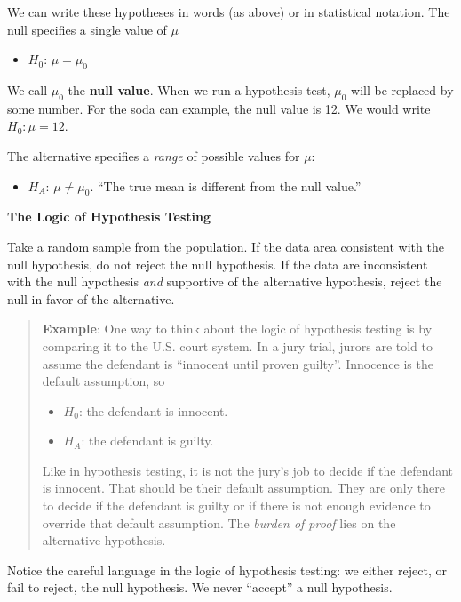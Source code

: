 \documentclass[
]{book}
\providecommand{\tightlist}{%
  \setlength{\itemsep}{0pt}\setlength{\parskip}{0pt}}
\begin{document}
We can write these hypotheses in words (as above) or in statistical notation. The null specifies a single value of \(\mu\)

\begin{itemize}
\tightlist
\item
  \(H_0\): \(\mu=\mu_0\)
\end{itemize}

We call \(\mu_0\) the \textbf{null value}. When we run a hypothesis test, \(\mu_0\) will be replaced by some number. For the soda can example, the null value is 12. We would write \(H_0: \mu = 12\).

The alternative specifies a \emph{range} of possible values for \(\mu\):

\begin{itemize}
\tightlist
\item
  \(H_A\): \(\mu\ne\mu_0\). ``The true mean is different from the null value.''
\end{itemize}

\textbf{The Logic of Hypothesis Testing}

Take a random sample from the population. If the data area consistent with the null hypothesis, do not reject the null hypothesis. If the data are inconsistent with the null hypothesis \emph{and} supportive of the alternative hypothesis, reject the null in favor of the alternative.

\begin{quote}
\textbf{Example}: One way to think about the logic of hypothesis testing is by comparing it to the U.S. court system. In a jury trial, jurors are told to assume the defendant is ``innocent until proven guilty''. Innocence is the default assumption, so

\begin{itemize}
\tightlist
\item
  \(H_0\): the defendant is innocent.
\item
  \(H_A\): the defendant is guilty.
\end{itemize}

Like in hypothesis testing, it is not the jury's job to decide if the defendant is innocent. That should be their default assumption. They are only there to decide if the defendant is guilty or if there is not enough evidence to override that default assumption. The \emph{burden of proof} lies on the alternative hypothesis.
\end{quote}

Notice the careful language in the logic of hypothesis testing: we either reject, or fail to reject, the null hypothesis. We never ``accept'' a null hypothesis.
\end{document}
